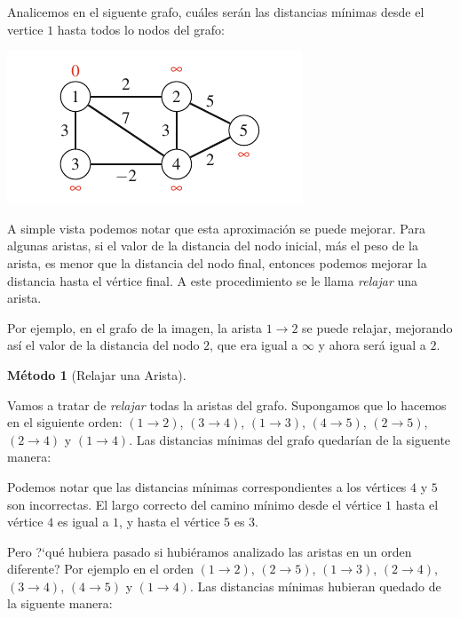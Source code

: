 \documentclass[a4paper, 10pt]{article}
\numberwithin{theoremCounter}{subsection}
\numberwithin{problemCounter}{subsection}
\numberwithin{defCounter}{subsection}
\numberwithin{obsCounter}{subsection}
\newcounter{methCounter}
\numberwithin{methCounter}{subsection}
\numberwithin{exampleCounter}{subsection}
\numberwithin{propCounter}{subsection}
\theoremstyle{violetnumbox}
\theoremstyle{blacknumex}
\newtheorem{corollaryT}[methCounter]{M\'etodo}
\newenvironment{corollary}{\begin{cBox}\begin{corollaryT}}{\end{corollaryT}\end{cBox}}
\begin{document}
\begin{multicols}{2}
    Analicemos en el siguente grafo, cu\'ales ser\'an las distancias m\'inimas desde el vertice $1$ hasta todos lo nodos del grafo:
    \begin{minipage}{\columnwidth}
        \includegraphics[width=\linewidth]{imag/graph1}
        \label{example_sum}
    \end{minipage}

    A simple vista podemos notar que esta aproximaci\'on se puede mejorar. Para algunas aristas, si el valor de la distancia del nodo inicial, m\'as el peso de la arista, es menor que la distancia del nodo final, entonces podemos mejorar la distancia hasta el v\'ertice final. A este procedimiento se le llama \textit{relajar} una arista.

    Por ejemplo, en el grafo de la imagen, la arista $1 \rightarrow 2$ se puede relajar, mejorando as\'i el valor de la distancia del nodo $2$, que era igual a $\infty$ y ahora ser\'a igual a $2$.

    \begin{corollary}[Relajar una Arista]
    \end{corollary}

    Vamos a tratar de \textit{relajar} todas la aristas del grafo. Supongamos que lo hacemos en el siguiente orden: $(1 \rightarrow 2)$, $(3 \rightarrow 4)$, $(1 \rightarrow 3)$, $(4 \rightarrow 5)$, $(2 \rightarrow 5)$, $(2 \rightarrow 4)$ y $(1 \rightarrow 4)$. Las distancias m\'inimas del grafo quedar\'ian de la siguente manera:


    Podemos notar que las distancias m\'inimas correspondientes a los v\'ertices $4$ y $5$ son incorrectas. El largo correcto del camino m\'inimo desde el v\'ertice $1$ hasta el v\'ertice $4$ es igual a $1$, y hasta el v\'ertice $5$ es $3$.

    Pero ?`qu\'e hubiera pasado si hubi\'eramos analizado las aristas en un orden diferente? Por ejemplo en el orden $(1 \rightarrow 2)$, $(2 \rightarrow 5)$, $(1 \rightarrow 3)$, $(2 \rightarrow 4)$, $(3 \rightarrow 4)$, $(4 \rightarrow 5)$ y $(1 \rightarrow 4)$. Las distancias m\'inimas hubieran quedado de la siguente manera:


\end{multicols}
\end{document}
